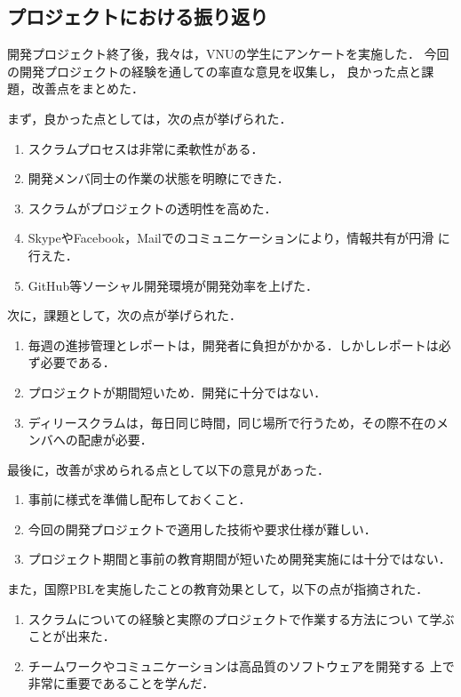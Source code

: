 \documentclass[a4j, 12Q, twocolumn, twoside]{jsarticle}
\begin{document}
\subsection{プロジェクトにおける振り返り}
開発プロジェクト終了後，我々は，VNUの学生にアンケートを実施した．
今回の開発プロジェクトの経験を通しての率直な意見を収集し，
良かった点と課題，改善点をまとめた．

まず，良かった点としては，次の点が挙げられた．

\begin{enumerate}
 \item スクラムプロセスは非常に柔軟性がある．
 \item 開発メンバ同士の作業の状態を明瞭にできた．
 \item スクラムがプロジェクトの透明性を高めた．
 \item SkypeやFacebook，Mailでのコミュニケーションにより，情報共有が円滑
       に行えた．
 \item GitHub等ソーシャル開発環境が開発効率を上げた．
\end{enumerate}

次に，課題として，次の点が挙げられた．

\begin{enumerate}
 \item 毎週の進捗管理とレポートは，開発者に負担がかかる．しかしレポートは必ず必要である．
 \item プロジェクトが期間短いため．開発に十分ではない．
 \item ディリースクラムは，毎日同じ時間，同じ場所で行うため，その際不在のメンバへの配慮が必要．
\end{enumerate}

最後に，改善が求められる点として以下の意見があった．

\begin{enumerate}
 \item 事前に様式を準備し配布しておくこと．
 \item 今回の開発プロジェクトで適用した技術や要求仕様が難しい．
 \item プロジェクト期間と事前の教育期間が短いため開発実施には十分ではない．
\end{enumerate}

また，国際PBLを実施したことの教育効果として，以下の点が指摘された．

\begin{enumerate}
 \item スクラムについての経験と実際のプロジェクトで作業する方法につい
       て学ぶことが出来た．
 \item チームワークやコミュニケーションは高品質のソフトウェアを開発する
       上で非常に重要であることを学んだ．
\end{enumerate}
\end{document}
